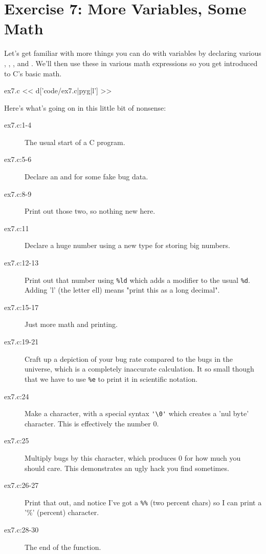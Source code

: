 \chapter{Exercise 7: More Variables, Some Math}

Let's get familiar with more things you can do with variables by 
declaring various , , , and 
.  We'll then use these in various math expressions
so you get introduced to C's basic math.

\begin{code}{ex7.c}
<< d['code/ex7.c|pyg|l'] >>
\end{code}

Here's what's going on in this little bit of nonsense:

\begin{description}
\item[ex7.c:1-4] The usual start of a C program.
\item[ex7.c:5-6] Declare an  and  for some fake bug data.
\item[ex7.c:8-9] Print out those two, so nothing new here.
\item[ex7.c:11] Declare a huge number using a new type  for storing
    big numbers.
\item[ex7.c:12-13] Print out that number using \verb|%ld| which adds a modifier
    to the usual \verb|%d|. Adding 'l' (the letter ell) means "print this
    as a long decimal".
\item[ex7.c:15-17] Just more math and printing.
\item[ex7.c:19-21] Craft up a depiction of your bug rate compared to the bugs in
    the universe, which is a completely inaccurate calculation.  It so small
    though that we have to use \verb|%e| to print it in scientific notation.
\item[ex7.c:24] Make a character, with a special syntax \verb|'\0'| which creates
    a 'nul byte' character.  This is effectively the number 0.
\item[ex7.c:25] Multiply bugs by this character, which produces 0 for how much you
    should care.  This demonstrates an ugly hack you find sometimes.
\item[ex7.c:26-27] Print that out, and notice I've got a \verb|%%| (two percent
        chars) so I can print a '\%' (percent) character.
\item[ex7.c:28-30] The end of the  function.
\end{description}

